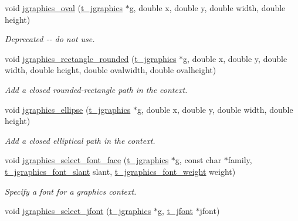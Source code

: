 \begin{DoxyCompactItemize}
void \hyperlink{group__jgraphics_gabdf52225c137e70eea1f955559d19591}{jgraphics\_\-oval} (\hyperlink{group__jgraphics_ga4bf27bd7e21a59a427481b909d4656e7}{t\_\-jgraphics} $\ast$g, double x, double y, double width, double height)
\begin{DoxyCompactList}\small\item\em Deprecated -\/-\/ do not use. \item\end{DoxyCompactList}\item 
void \hyperlink{group__jgraphics_ga0e15af397f5f4eb1e474e31ea43e1d7c}{jgraphics\_\-rectangle\_\-rounded} (\hyperlink{group__jgraphics_ga4bf27bd7e21a59a427481b909d4656e7}{t\_\-jgraphics} $\ast$g, double x, double y, double width, double height, double ovalwidth, double ovalheight)
\begin{DoxyCompactList}\small\item\em Add a closed rounded-\/rectangle path in the context. \item\end{DoxyCompactList}\item 
void \hyperlink{group__jgraphics_ga1703b907a1167055ecea6674e00233d4}{jgraphics\_\-ellipse} (\hyperlink{group__jgraphics_ga4bf27bd7e21a59a427481b909d4656e7}{t\_\-jgraphics} $\ast$g, double x, double y, double width, double height)
\begin{DoxyCompactList}\small\item\em Add a closed elliptical path in the context. \item\end{DoxyCompactList}\item 
void \hyperlink{group__jgraphics_ga0c184facd0030b513e63162fca2225cd}{jgraphics\_\-select\_\-font\_\-face} (\hyperlink{group__jgraphics_ga4bf27bd7e21a59a427481b909d4656e7}{t\_\-jgraphics} $\ast$g, const char $\ast$family, \hyperlink{group__jfont_gaea63403193677b088b56cb60c69c37b4}{t\_\-jgraphics\_\-font\_\-slant} slant, \hyperlink{group__jfont_ga29fc4356e11166a16aeae50dd5e22f86}{t\_\-jgraphics\_\-font\_\-weight} weight)
\begin{DoxyCompactList}\small\item\em Specify a font for a graphics context. \item\end{DoxyCompactList}\item 
void \hyperlink{group__jgraphics_ga1299d24b9d9d6b0955a214e813c6463c}{jgraphics\_\-select\_\-jfont} (\hyperlink{group__jgraphics_ga4bf27bd7e21a59a427481b909d4656e7}{t\_\-jgraphics} $\ast$g, \hyperlink{group__jfont_ga75f83f853e52af957c799723cac89ae5}{t\_\-jfont} $\ast$jfont)

\end{DoxyCompactItemize}

